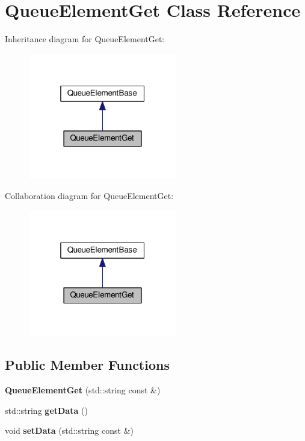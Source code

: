 \hypertarget{classQueueElementGet}{}\section{Queue\+Element\+Get Class Reference}
\label{classQueueElementGet}


Inheritance diagram for Queue\+Element\+Get\+:\nopagebreak
\begin{figure}[H]
\begin{center}
\leavevmode
\includegraphics[width=184pt]{classQueueElementGet__inherit__graph}
\end{center}
\end{figure}


Collaboration diagram for Queue\+Element\+Get\+:\nopagebreak
\begin{figure}[H]
\begin{center}
\leavevmode
\includegraphics[width=184pt]{classQueueElementGet__coll__graph}
\end{center}
\end{figure}
\subsection*{Public Member Functions}
\begin{DoxyCompactItemize}
\item 
{\bfseries Queue\+Element\+Get} (std\+::string const \&)\hypertarget{classQueueElementGet_a45a2f0b71296d26da6934accf0b2dd16}{}\label{classQueueElementGet_a45a2f0b71296d26da6934accf0b2dd16}

\item 
std\+::string {\bfseries get\+Data} ()\hypertarget{classQueueElementGet_a6a0d5bc87f2f06ec8f31ca4f1ef249a1}{}\label{classQueueElementGet_a6a0d5bc87f2f06ec8f31ca4f1ef249a1}

\item 
void {\bfseries set\+Data} (std\+::string const \&)\hypertarget{classQueueElementGet_aefa414c7a54bf6db99e201b887710061}{}\label{classQueueElementGet_aefa414c7a54bf6db99e201b887710061}

\end{DoxyCompactItemize}
